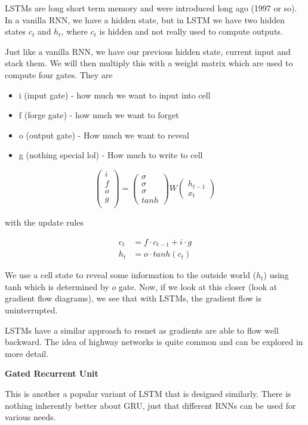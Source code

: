 LSTMs are long short term memory and were introduced long ago (1997 or so). In a vanilla RNN, we have a hidden state, but in LSTM we have two hidden states $c_t$ and $h_t$, where $c_t$ is hidden and not really used to compute outputs. 

Just like a vanilla RNN, we have our previous hidden state, current input and stack them. We will then multiply this with a weight matrix which are used to compute four gates. They are 

\begin{itemize}
    \item i (input gate) - how much we want to input into cell
    \item f (forge gate) - how much we want to forget 
    \item o (output gate) - How much we want to reveal
    \item g (nothing special lol) - How much to write to cell
\end{itemize}

\begin{equation}
    \begin{pmatrix}
    i \\
    f \\
    o\\
    g\\
    \end{pmatrix} = \begin{pmatrix}
    \sigma \\
    \sigma \\
    \sigma \\
    tanh
    \end{pmatrix} W \begin{pmatrix}h_{t-1} \\ x_t \end{pmatrix}
\end{equation}

with the update rules

\begin{align}
    c_t &= f\cdot c_{t-1} + i\cdot g\\
    h_t &= o\cdot tanh(c_t)
\end{align}

We use a cell state to reveal some information to the outside world ($h_t$) using tanh which is determined by $o$ gate. Now, if we look at this closer (look at gradient flow diagrams), we see that with LSTMs, the gradient flow is uninterrupted.  

LSTMs have a similar approach to resnet as gradients are able to flow well backward. The idea of highway networks is quite common and can be explored in more detail.

\textbf{Gated Recurrent Unit}

This is another a popular variant of LSTM that is designed similarly. There is nothing inherently better about GRU, just that different RNNs can be used for various needs.